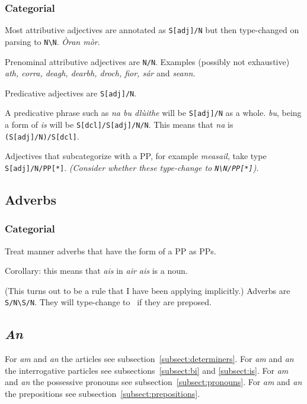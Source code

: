 \documentclass[a4paper]{article}
\begin{document}
\subsubsection*{Categorial}

 Most attributive adjectives are annotated as \texttt{S[adj]/N} but then type-changed on parsing to \texttt{N\textbackslash N}.
\textit{\`Oran m\`or}.

 Prenominal attributive adjectives are \texttt{N/N}.
Examples (possibly not exhaustive) \textit{ath, corra, deagh, dearbh, droch, fior, s\'ar} and \textit{seann}.

 Predicative adjectives are \texttt{S[adj]/N}.

 A predicative phrase such as \textit{na bu dl\`uithe} will be \texttt{S[adj]/N} as a whole.
\textit{bu}, being a form of \textit{is} will be \texttt{S[dcl]/S[adj]/N/N}. This means that \textit{na} is \texttt{(S[adj]/N)/S[dcl]}.

 Adjectives that subcategorize with a PP, for example \textit{measail}, take type \texttt{S[adj]/N/PP[*]}.
\textit{(Consider whether these type-change to \texttt{N\textbackslash N/PP[*]})}.

\subsection{Adverbs\label{subsect:adverbs}}

\subsubsection*{Categorial}

\newcommand{\SsNbSsN}{\texttt{S/N\textbackslash S/N}}

 Treat manner adverbs that have the form of a PP as PPs.

 Corollary: this means that \textit{ais} in \textit{air ais}
is a noun.

 (This turns out to be a rule that I have been applying implicitly.) 
Adverbs are \SsNbSsN.
They will type-change to \SsS\ if they are preposed.



\subsection{\textit{An}}

For \textit{am} and \textit{an} the articles see subsection~\ref{subsect:determiners}.
For \textit{am} and \textit{an} the interrogative particles see subsections~\ref{subsect:bi} and \ref{subsect:is}.
For \textit{am} and \textit{an} the possessive pronouns see subsection~\ref{subsect:pronouns}.
For \textit{am} and \textit{an} the prepositions see subsection~\ref{subsect:prepositions}.
\end{document}

